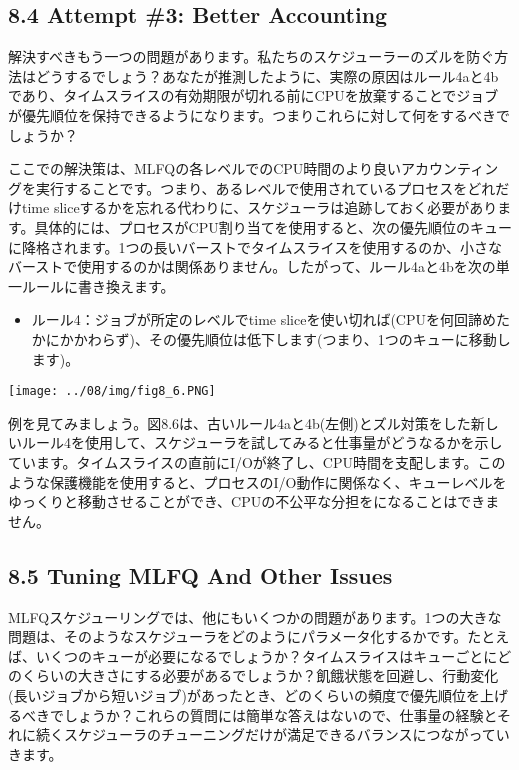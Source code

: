 \hypertarget{attempt-3-better-accounting}{%
\subsection*{8.4 Attempt \#3: Better
Accounting}\label{attempt-3-better-accounting}}

解決すべきもう一つの問題があります。私たちのスケジューラーのズルを防ぐ方法はどうするでしょう？あなたが推測したように、実際の原因はルール4aと4bであり、タイムスライスの有効期限が切れる前にCPUを放棄することでジョブが優先順位を保持できるようになります。つまりこれらに対して何をするべきでしょうか？

ここでの解決策は、MLFQの各レベルでのCPU時間のより良いアカウンティングを実行することです。つまり、あるレベルで使用されているプロセスをどれだけtime
sliceするかを忘れる代わりに、スケジューラは追跡しておく必要があります。具体的には、プロセスがCPU割り当てを使用すると、次の優先順位のキューに降格されます。1つの長いバーストでタイムスライスを使用するのか、小さなバーストで使用するのかは関係ありません。したがって、ルール4aと4bを次の単一ルールに書き換えます。

\begin{itemize}
\tightlist
\item
  ルール4：ジョブが所定のレベルでtime
  sliceを使い切れば(CPUを何回諦めたかにかかわらず)、その優先順位は低下します(つまり、1つのキューに移動します)。
\end{itemize}

\texttt{[image: ../08/img/fig8\_6.PNG]}

例を見てみましょう。図8.6は、古いルール4aと4b(左側)とズル対策をした新しいルール4を使用して、スケジューラを試してみると仕事量がどうなるかを示しています。タイムスライスの直前にI/Oが終了し、CPU時間を支配します。このような保護機能を使用すると、プロセスのI/O動作に関係なく、キューレベルをゆっくりと移動させることができ、CPUの不公平な分担をになることはできません。

\hypertarget{tuning-mlfq-and-other-issues}{%
\subsection*{8.5 Tuning MLFQ And Other
Issues}\label{tuning-mlfq-and-other-issues}}

MLFQスケジューリングでは、他にもいくつかの問題があります。1つの大きな問題は、そのようなスケジューラをどのようにパラメータ化するかです。たとえば、いくつのキューが必要になるでしょうか？タイムスライスはキューごとにどのくらいの大きさにする必要があるでしょうか？飢餓状態を回避し、行動変化(長いジョブから短いジョブ)があったとき、どのくらいの頻度で優先順位を上げるべきでしょうか？これらの質問には簡単な答えはないので、仕事量の経験とそれに続くスケジューラのチューニングだけが満足できるバランスにつながっていきます。

